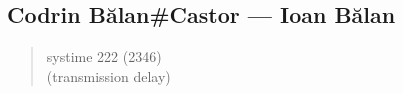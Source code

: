 \hypertarget{codrin-bux103lancastor-ioan-bux103lan}{%
\subsection{Codrin Bălan\#Castor — Ioan Bălan}\label{codrin-bux103lancastor-ioan-bux103lan}}

\begin{quote}
systime 222 (2346)\\
(transmission delay)
\end{quote}
